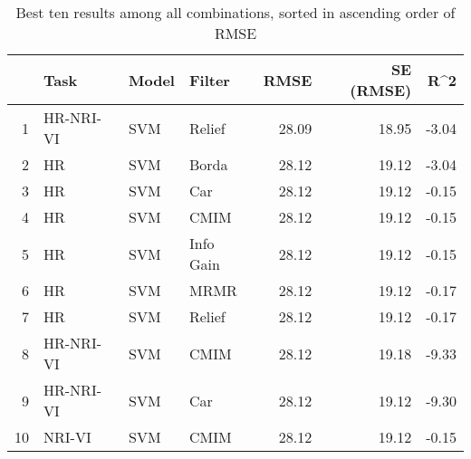 \begin{table}[ht!]
\centering
\caption{Best ten results among all combinations, sorted in ascending order of RMSE} 
\label{tab:perf-top-10}
\begin{tabular}{rlllrrr}
  \hline
 & Task & Model & Filter & RMSE & SE (RMSE) & R^2 \\ 
  \hline
1 & HR-NRI-VI & SVM & Relief & 28.09 & 18.95 & -3.04 \\ 
  2 & HR & SVM & Borda & 28.12 & 19.12 & -3.04 \\ 
  3 & HR & SVM & Car & 28.12 & 19.12 & -0.15 \\ 
  4 & HR & SVM & CMIM & 28.12 & 19.12 & -0.15 \\ 
  5 & HR & SVM & Info Gain & 28.12 & 19.12 & -0.15 \\ 
  6 & HR & SVM & MRMR & 28.12 & 19.12 & -0.17 \\ 
  7 & HR & SVM & Relief & 28.12 & 19.12 & -0.17 \\ 
  8 & HR-NRI-VI & SVM & CMIM & 28.12 & 19.18 & -9.33 \\ 
  9 & HR-NRI-VI & SVM & Car & 28.12 & 19.12 & -9.30 \\ 
  10 & NRI-VI & SVM & CMIM & 28.12 & 19.12 & -0.15 \\ 
   \hline
\end{tabular}
\end{table}
